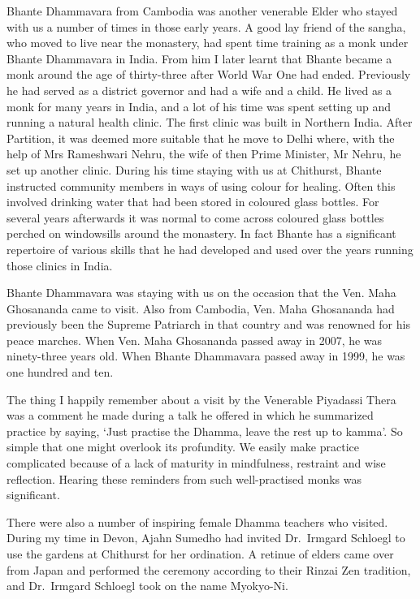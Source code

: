 \enlargethispage{\baselineskip}

Bhante Dhammavara\cite{dhammavara} from Cambodia was another venerable Elder who
stayed with us a number of times in those early years. A good lay friend
of the sangha, who moved to live near the monastery, had spent time
training as a monk under Bhante Dhammavara in India. From him I later
learnt that Bhante became a monk around the age of thirty-three after
World War One had ended. Previously he had served as a district governor
and had a wife and a child. He lived as a monk for many years in India,
and a lot of his time was spent setting up and running a natural health
clinic. The first clinic was built in Northern India. After Partition\cite{partition},
it was deemed more suitable that he move to Delhi where, with
the help of Mrs Rameshwari Nehru\cite{nehru}, the wife of then
Prime Minister, Mr Nehru, he set up another
clinic. During his time staying with us at Chithurst, Bhante instructed
community members in ways of using colour for healing. Often this
involved drinking water that had been stored in coloured glass bottles.
For several years afterwards it was normal to come across coloured glass
bottles perched on windowsills around the monastery. In fact Bhante has
a significant repertoire of various skills that he had developed and
used over the years running those clinics in India.

Bhante Dhammavara was staying with us on the occasion that the
Ven. Maha Ghosananda\cite{ghosananda} came to visit. Also from Cambodia, Ven. Maha
Ghosananda had previously been the Supreme Patriarch in that country and
was renowned for his peace marches. When Ven. Maha Ghosananda passed
away in 2007, he was ninety-three years old. When Bhante Dhammavara
passed away in 1999, he was one hundred and ten.

The thing I happily remember about a visit by the Venerable Piyadassi Thera was
a comment he made during a talk he offered in which he summarized
practice by saying, `Just practise the Dhamma, leave the rest up to
kamma'. So simple that one might overlook its profundity. We easily make
practice complicated because of a lack of maturity in mindfulness,
restraint and wise reflection. Hearing these reminders from such
well-practised monks was significant.

There were also a number of inspiring female Dhamma teachers who
visited. During my time in Devon, Ajahn Sumedho had invited Dr.~Irmgard
Schloegl to use the gardens at Chithurst for her ordination. A retinue
of elders came over from Japan and performed the ceremony according to
their Rinzai Zen tradition, and Dr.~Irmgard Schloegl took on the name
Myokyo-Ni.

